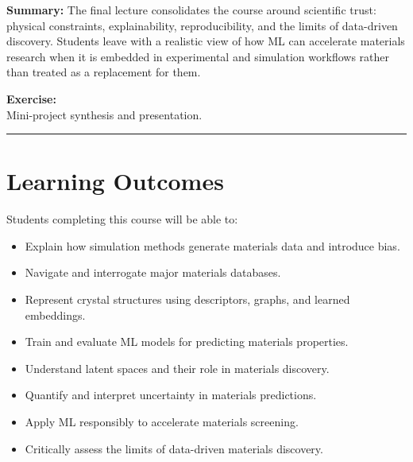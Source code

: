 \documentclass[
]{agujournal2019}
\providecommand{\tightlist}{%
  \setlength{\itemsep}{0pt}\setlength{\parskip}{0pt}}
\begin{document}
\textbf{Summary:} The final lecture consolidates the course around
scientific trust: physical constraints, explainability, reproducibility,
and the limits of data-driven discovery. Students leave with a realistic
view of how ML can accelerate materials research when it is embedded in
experimental and simulation workflows rather than treated as a
replacement for them.

\textbf{Exercise:}\\
Mini-project synthesis and presentation.

\begin{center}\rule{0.5\linewidth}{0.5pt}\end{center}

\section{Learning Outcomes}\label{learning-outcomes}

Students completing this course will be able to:

\begin{itemize}
\tightlist
\item
  Explain how simulation methods generate materials data and introduce
  bias.
\item
  Navigate and interrogate major materials databases.
\item
  Represent crystal structures using descriptors, graphs, and learned
  embeddings.
\item
  Train and evaluate ML models for predicting materials properties.
\item
  Understand latent spaces and their role in materials discovery.
\item
  Quantify and interpret uncertainty in materials predictions.
\item
  Apply ML responsibly to accelerate materials screening.
\item
  Critically assess the limits of data-driven materials discovery.
\end{itemize}
\end{document}
